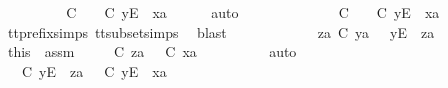 \begin{isabellebody}
\ \ \ \ \isamarkupfalse%
\ \isamarkupfalse%
\ {\isachardoublequoteopen}{\isasymexists}{\isasymrho}{\isacharprime}{\isachardot}\ {\isasymrho}{\isacharprime}\ {\isasymsubseteq}\isactrlsub C\ {\isasymsigma}{\isacharprime}\ {\isasymand}\ {\isasymrho}{\isacharprime}\ {\isasymle}\isactrlsub C\ {\isacharbrackleft}y{\isacharbrackright}\isactrlsub E\ {\isacharhash}\ xa{\isachardoublequoteclose}\isanewline
\ \ \ \ \isamarkupfalse%
\ auto\isanewline
\ \ \ \ \ \ \isamarkupfalse%
\ {\isachardoublequoteopen}{\isasymsigma}{\isacharprime}\ {\isacharequal}\ {\isacharbrackleft}{\isacharbrackright}\ {\isasymLongrightarrow}\ {\isasymexists}{\isasymrho}{\isacharprime}{\isachardot}\ {\isasymrho}{\isacharprime}\ {\isasymsubseteq}\isactrlsub C\ {\isacharbrackleft}{\isacharbrackright}\ {\isasymand}\ {\isasymrho}{\isacharprime}\ {\isasymle}\isactrlsub C\ {\isacharbrackleft}y{\isacharbrackright}\isactrlsub E\ {\isacharhash}\ xa{\isachardoublequoteclose}\isanewline
\ \ \ \ \ \ \ \ \isamarkupfalse%
\ tt{\isacharunderscore}prefix{\isachardot}simps{\isacharparenleft}{}{\isacharparenright}\ tt{\isacharunderscore}subset{\isachardot}simps{\isacharparenleft}{}{\isacharparenright}\ \isamarkupfalse%
\ blast\isanewline
\ \ \ \ \isamarkupfalse%
\isanewline
\ \ \ \ \ \ \isamarkupfalse%
\ {\isachardoublequoteopen}za\ {\isasymle}\isactrlsub C\ ya{\isachardoublequoteclose}\ {\isachardoublequoteopen}{\isasymsigma}{\isacharprime}\ {\isacharequal}\ {\isacharbrackleft}y{\isacharbrackright}\isactrlsub E\ {\isacharhash}\ za{\isachardoublequoteclose}\isanewline
\ \ \ \ \ \ \isamarkupfalse%
\ this\ \ assm{}\ \isamarkupfalse%
\ {\isasymrho}{\isacharprime}\ \ {\isachardoublequoteopen}{\isasymrho}{\isacharprime}\ {\isasymsubseteq}\isactrlsub C\ za\ {\isasymand}\ {\isasymrho}{\isacharprime}\ {\isasymle}\isactrlsub C\ xa{\isachardoublequoteclose}\isanewline
\ \ \ \ \ \ \ \ \isamarkupfalse%
\ auto\isanewline
\ \ \ \ \ \ \isamarkupfalse%
\ \isamarkupfalse%
\ {\isachardoublequoteopen}{\isasymexists}{\isasymrho}{\isacharprime}{\isachardot}\ {\isasymrho}{\isacharprime}\ {\isasymsubseteq}\isactrlsub C\ {\isacharbrackleft}y{\isacharbrackright}\isactrlsub E\ {\isacharhash}\ za\ {\isasymand}\ {\isasymrho}{\isacharprime}\ {\isasymle}\isactrlsub C\ {\isacharbrackleft}y{\isacharbrackright}\isactrlsub E\ {\isacharhash}\ xa{\isachardoublequoteclose}\isanewline

\end{isabellebody}
